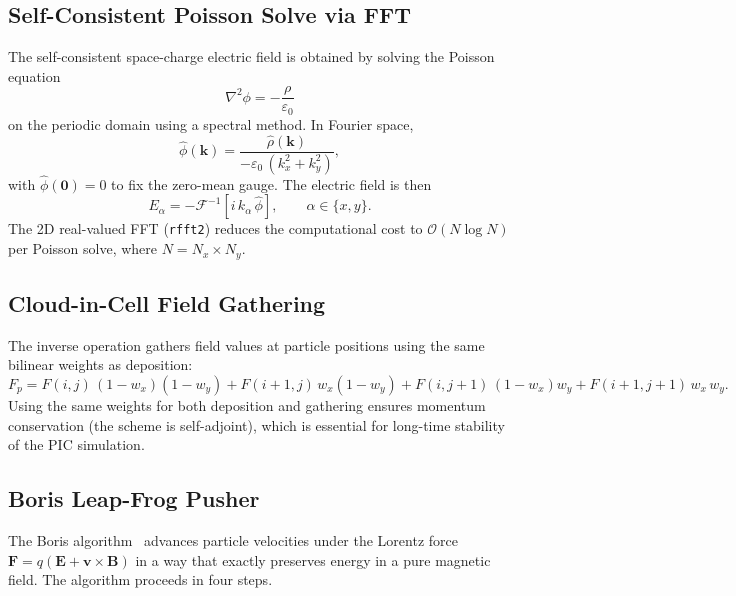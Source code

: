 \documentclass[11pt,a4paper]{report}
\begin{document}
\subsection{Self-Consistent Poisson Solve via FFT}

The self-consistent space-charge electric field is obtained by solving the Poisson equation
\begin{equation}
  \nabla^2 \phi = -\frac{\rho}{\varepsilon_0}
  \label{eq:poisson}
\end{equation}
on the periodic domain using a spectral method.  In Fourier space,
\begin{equation}
  \hat{\phi}(\mathbf{k}) = \frac{\hat{\rho}(\mathbf{k})}
    {-\varepsilon_0\,(k_x^2 + k_y^2)},
  \label{eq:poisson-fourier}
\end{equation}
with $\hat{\phi}(\mathbf{0}) = 0$ to fix the zero-mean gauge.  The electric field is then
\begin{equation}
  E_\alpha = -\mathcal{F}^{-1}\!\left[i\,k_\alpha\,\hat{\phi}\right], \qquad
  \alpha \in \{x, y\}.
  \label{eq:poisson-efield}
\end{equation}
The 2D real-valued FFT (\texttt{rfft2}) reduces the computational cost to $\mathcal{O}(N \log N)$ per Poisson solve, where $N = N_x \times N_y$.

\subsection{Cloud-in-Cell Field Gathering}

The inverse operation gathers field values at particle positions using the same bilinear weights as deposition:
\begin{equation}
  F_p = F(i,j)\,(1{-}w_x)(1{-}w_y) + F(i{+}1,j)\,w_x(1{-}w_y)
      + F(i,j{+}1)\,(1{-}w_x)w_y + F(i{+}1,j{+}1)\,w_x\,w_y.
  \label{eq:cic-gather}
\end{equation}
Using the same weights for both deposition and gathering ensures momentum conservation (the scheme is self-adjoint), which is essential for long-time stability of the PIC simulation.

\subsection{Boris Leap-Frog Pusher}

The Boris algorithm~\cite{Boris1970,Birdsall2004} advances particle velocities under the Lorentz force $\mathbf{F} = q(\mathbf{E} + \mathbf{v} \times \mathbf{B})$ in a way that exactly preserves energy in a pure magnetic field.  The algorithm proceeds in four steps.
\end{document}
